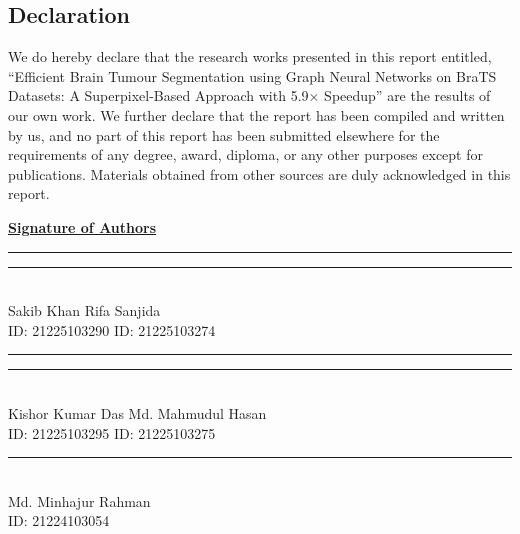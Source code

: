 \documentclass{article}
\begin{document}
\begin{center}
    \section*{Declaration}
\end{center}
\large
We do hereby declare that the research works presented in this report entitled,
``Efficient Brain Tumour Segmentation using Graph Neural Networks on BraTS Datasets:
A Superpixel-Based Approach with 5.9$\times$ Speedup'' are the results of our
own work. We further declare that the report has been compiled and written by us,
and no part of this report has been submitted elsewhere for the requirements of any
degree, award, diploma, or any other purposes except for publications. Materials
obtained from other sources are duly acknowledged in this report.

\vspace{10mm}
\begin{flushleft}
\textbf{\underline{Signature of Authors}}

\vspace{20mm}

\parbox{6cm}{\centering\rule{6cm}{0.4pt}\vspace{2mm}} \null\hfill
\parbox{6cm}{\centering\rule{6cm}{0.4pt}\vspace{2mm}}\\
Sakib Khan \null\hfill Rifa Sanjida \\
ID: 21225103290 \null\hfill ID: 21225103274 \\

\vspace{15mm}

\parbox{6cm}{\centering\rule{6cm}{0.4pt}\vspace{2mm}} \null\hfill
\parbox{6cm}{\centering\rule{6cm}{0.4pt}\vspace{2mm}}\\
Kishor Kumar Das \null\hfill Md. Mahmudul Hasan\\
ID: 21225103295 \null\hfill ID: 21225103275\\

\vspace{15mm}

\parbox{6cm}{\centering\rule{6cm}{0.4pt}\vspace{2mm}}\\
Md. Minhajur Rahman\\
ID: 21224103054 \\
\end{flushleft}
\cleardoublepage
\end{document}

